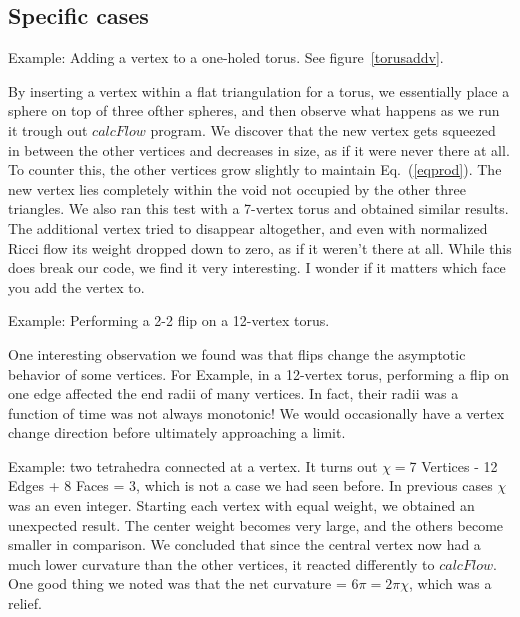 \documentclass[12pt]{article}
\begin{document}
\subsection{Specific cases}

\noindent Example: Adding a vertex to a one-holed torus. See figure~\ref{torusaddv}. \newline

\noindent By inserting a vertex within a flat triangulation for a torus, we essentially place a sphere on top of three ofther spheres, and then observe what happens as we run it trough out $calcFlow$ program. We discover that the new vertex gets squeezed in between the other vertices and decreases in size, as if it were never there at all. To counter this, the other vertices grow slightly to maintain Eq.~(\ref{eqprod}). The new vertex lies completely within the void not occupied by the other three triangles. We also ran this test with a 7-vertex torus and obtained similar results. The additional vertex tried to disappear altogether, and even with normalized Ricci flow its weight dropped down to zero, as if it weren't there at all. While this does break our code, we find it very interesting. I wonder if it matters which face you add the vertex to. \newline

\noindent Example: Performing a 2-2 flip on a 12-vertex torus. \newline

\noindent One interesting observation we found was that flips change the asymptotic behavior of some vertices. For Example, in a 12-vertex torus, performing a flip on one edge affected the end radii of many vertices. In fact, their radii was a function of time was not always monotonic! We would occasionally have a vertex change direction before ultimately approaching a limit.\newline 

\noindent Example: two tetrahedra connected at a vertex. It turns out $\chi = $7 Vertices - 12 Edges + 8 Faces = 3, which is not a case we had seen before. In previous cases $\chi$ was an even integer. Starting each vertex with equal weight, we obtained an unexpected result. The center weight becomes very large, and the others become smaller in comparison. We concluded that since the central vertex now had a much lower curvature than the other vertices, it reacted differently to $calcFlow$. One good thing we noted was that the net curvature = $6\pi = 2\pi\chi$, which was a relief.  
\end{document}
